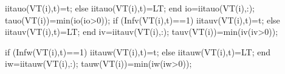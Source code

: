                                               iitauo(VT(i),t)=t;                                              
                                          else
                                              iitauo(VT(i),t)=LT;
                                          end
                                          io=iitauo(VT(i),:);
                                          tauo(VT(i))=min(io(io>0));
                                          if (Infv(VT(i),t)==1)                                              
                                              iitauv(VT(i),t)=t;                                           
                                          else
                                              iitauv(VT(i),t)=LT;                                             
                                          end
                                          iv=iitauv(VT(i),:);
                                          tauv(VT(i))=min(iv(iv>0));
                                          
                                          if (Infw(VT(i),t)==1)                                              
                                              iitauw(VT(i),t)=t;                                           
                                          else
                                              iitauw(VT(i),t)=LT;                                             
                                          end
                                          iw=iitauw(VT(i),:);
                                          tauw(VT(i))=min(iw(iw>0));
                                          
